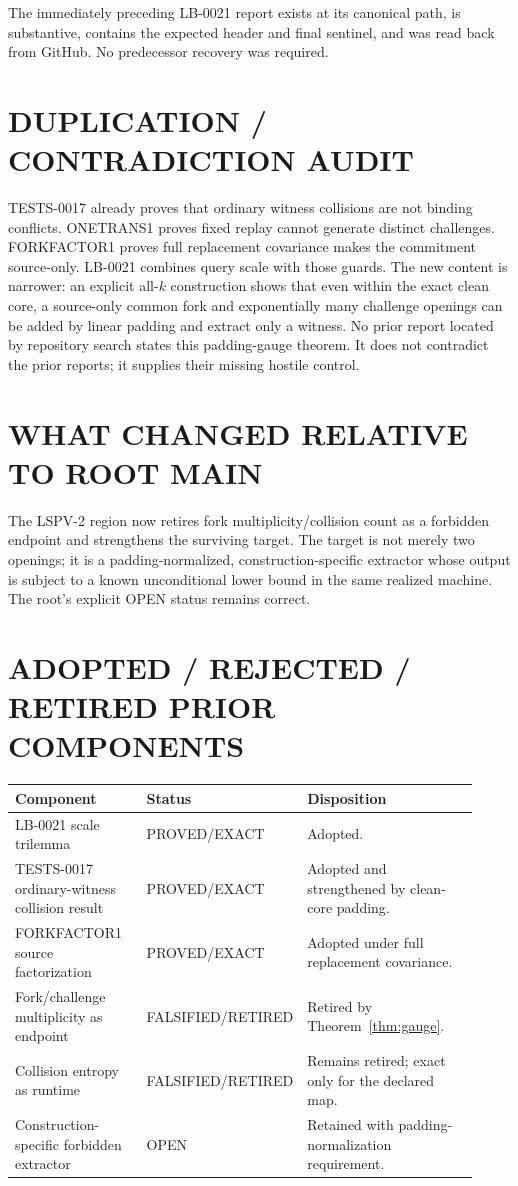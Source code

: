 \documentclass[11pt]{article}
\begin{document}
The immediately preceding LB-0021 report exists at its canonical path, is
substantive, contains the expected header and final sentinel, and was read
back from GitHub.  No predecessor recovery was required.

\section{DUPLICATION / CONTRADICTION AUDIT}

TESTS-0017 already proves that ordinary witness collisions are not binding
conflicts.  ONETRANS1 proves fixed replay cannot generate distinct challenges.
FORKFACTOR1 proves full replacement covariance makes the commitment
source-only.  LB-0021 combines query scale with those guards.  The new content
is narrower: an explicit all-$k$ construction shows that even within the
exact clean core, a source-only common fork and exponentially many challenge
openings can be added by linear padding and extract only a witness.  No prior
report located by repository search states this padding-gauge theorem.  It
does not contradict the prior reports; it supplies their missing hostile
control.

\section{WHAT CHANGED RELATIVE TO ROOT MAIN}

The LSPV-2 region now retires fork multiplicity/collision count as a forbidden
endpoint and strengthens the surviving target.  The target is not merely two
openings; it is a padding-normalized, construction-specific extractor whose
output is subject to a known unconditional lower bound in the same realized
machine.  The root's explicit OPEN status remains correct.

\section{ADOPTED / REJECTED / RETIRED PRIOR COMPONENTS}

\begin{center}
\begin{tabular}{@{}p{0.31\linewidth}p{0.19\linewidth}p{0.42\linewidth}@{}}
\toprule
Component & Status & Disposition\\
\midrule
LB-0021 scale trilemma & PROVED/EXACT & Adopted.\\
TESTS-0017 ordinary-witness collision result & PROVED/EXACT & Adopted and strengthened by clean-core padding.\\
FORKFACTOR1 source factorization & PROVED/EXACT & Adopted under full replacement covariance.\\
Fork/challenge multiplicity as endpoint & FALSIFIED/RETIRED & Retired by Theorem~\ref{thm:gauge}.\\
Collision entropy as runtime & FALSIFIED/RETIRED & Remains retired; exact only for the declared map.\\
Construction-specific forbidden extractor & OPEN & Retained with padding-normalization requirement.\\
\bottomrule
\end{tabular}
\end{center}
\end{document}
